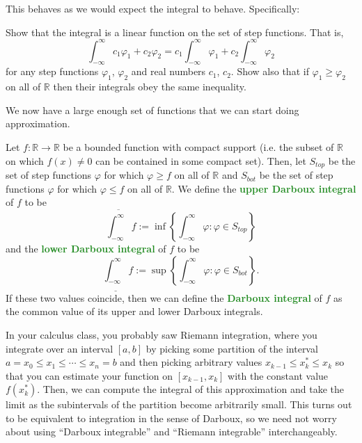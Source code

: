 \documentclass[10pt]{scrartcl}
\providecommand{\ol}{\overline}
\providecommand{\RR}{\mathbb R}
\providecommand{\vocab}[1]{{\textbf{\textcolor{ForestGreen}{#1}}}}
\begin{document}
This behaves as we would expect the integral to behave.
Specifically:
\begin{exercise}
	Show that the integral is a linear function on the set of step functions.
	That is,
	\[\int_{-\infty}^\infty c_1\varphi_1 + c_2\varphi_2 =
	c_1\int_{-\infty}^\infty \varphi_1 + c_2\int_{-\infty}^\infty \varphi_2\]
	for any step functions $\varphi_1$, $\varphi_2$ and
	real numbers $c_1$, $c_2$.
	Show also that if $\varphi_1\ge \varphi_2$ on all of $\RR$
	then their integrals obey the same inequality.
\end{exercise}

We now have a large enough set of functions that
we can start doing approximation.

\begin{definition}
	Let $f\colon\RR\to\RR$ be a bounded function with compact support
	(i.e. the subset of $\RR$ on which $f(x)\ne 0$
	can be contained in some compact set).
	Then, let $S_{top}$ be the set of step functions $\varphi$
	for which $\varphi \ge f$ on all of $\RR$
	and $S_{bot}$ be the set of step functions $\varphi$
	for which $\varphi \le f$ on all of $\RR$.
	We define the \vocab{upper Darboux integral} of $f$ to be
	\[\ol{\int_{-\infty}^\infty} f :=
	\inf\left\{\int_{-\infty}^\infty \varphi : \varphi\in S_{top}\right\}\]
	and the \vocab{lower Darboux integral} of $f$ to be
	\[\underline{\int_{-\infty}^\infty} f :=
	\sup\left\{\int_{-\infty}^\infty \varphi : \varphi\in S_{bot}\right\}.\]
	If these two values coincide, then we can define the
	\vocab{Darboux integral} of $f$ as the common value
	of its upper and lower Darboux integrals.
\end{definition}

\begin{remark}
	In your calculus class, you probably saw Riemann integration,
	where you integrate over an interval $[a, b]$ by picking
	some partition of the interval $a = x_0 \le x_1\le\cdots\le x_n = b$
	and then picking arbitrary values $x_{k-1}\le x_k^*\le x_k$
	so that you can estimate your function on $[x_{k-1}, x_k]$
	with the constant value $f(x_k^*)$.
	Then, we can compute the integral of this approximation
	and take the limit as the subintervals of the partition
	become arbitrarily small.
	This turns out to be equivalent to integration in the sense of Darboux,
	so we need not worry about using ``Darboux integrable''
	and ``Riemann integrable'' interchangeably.
\end{remark}
\end{document}
